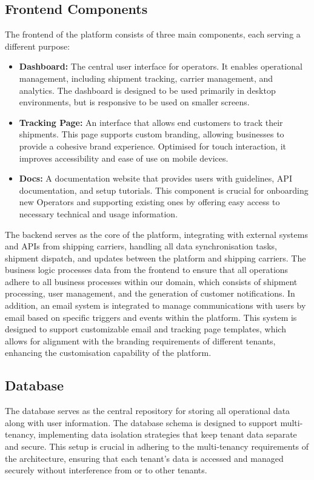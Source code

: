 \subsection{Frontend Components}
The frontend of the platform consists of three main components, each serving a different purpose:

\begin{itemize}
    \item \textbf{Dashboard:} The central user interface for operators. 
    It enables operational management, including shipment tracking, carrier management, and analytics. 
    The dashboard is designed to be used primarily in desktop environments, but is responsive to be used on smaller screens.
    \item \textbf{Tracking Page:} An interface that allows end customers to track their shipments. 
    This page supports custom branding, allowing businesses to provide a cohesive brand experience. 
    Optimised for touch interaction, it improves accessibility and ease of use on mobile devices.
    \item \textbf{Docs:} A documentation website that provides users with guidelines, API documentation, and setup tutorials.
    This component is crucial for onboarding new Operators and supporting existing ones by offering easy access to necessary technical and usage information.
\end{itemize}

The backend serves as the core of the platform, integrating with external systems and APIs from shipping carriers, handling all data synchronisation tasks, shipment dispatch, and updates between the platform and shipping carriers. 
The business logic processes data from the frontend to ensure that all operations adhere to all business processes within our domain, which consists of shipment processing, user management, and the generation of customer notifications. 
In addition, an email system is integrated to manage communications with users by email based on specific triggers and events within the platform. 
This system is designed to support customizable email and tracking page templates, which allows for alignment with the branding requirements of different tenants, enhancing the customisation capability of the platform.

\subsection{Database}
The database serves as the central repository for storing all operational data along with user information. 
The database schema is designed to support multi-tenancy, implementing data isolation strategies that keep tenant data separate and secure. This setup is crucial in adhering to the multi-tenancy requirements of the architecture, ensuring that each tenant's data is accessed and managed securely without interference from or to other tenants.

